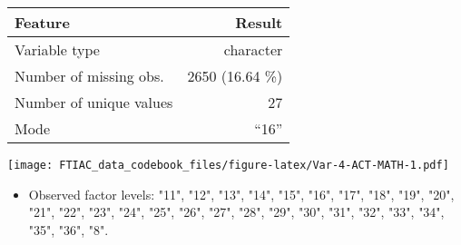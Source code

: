 \documentclass[]{article}
\providecommand{\tightlist}{%
  \setlength{\itemsep}{0pt}\setlength{\parskip}{0pt}}
\newcommand{\fullline}{\noindent\makebox[\linewidth]{\rule{\textwidth}{0.4pt}}}
\newcommand{\bminione}{\begin{minipage}{0.75 \textwidth}}
\newcommand{\bminitwo}{\begin{minipage}{0.25 \textwidth}}
\newcommand{\emini}{\end{minipage}}
\begin{document}
\bminione

\begin{longtable}[]{@{}lr@{}}
\toprule
\begin{minipage}[b]{0.34\columnwidth}\raggedright\strut
Feature\strut
\end{minipage} & \begin{minipage}[b]{0.21\columnwidth}\raggedleft\strut
Result\strut
\end{minipage}\tabularnewline
\midrule
\endhead
\begin{minipage}[t]{0.34\columnwidth}\raggedright\strut
Variable type\strut
\end{minipage} & \begin{minipage}[t]{0.21\columnwidth}\raggedleft\strut
character\strut
\end{minipage}\tabularnewline
\begin{minipage}[t]{0.34\columnwidth}\raggedright\strut
Number of missing obs.\strut
\end{minipage} & \begin{minipage}[t]{0.21\columnwidth}\raggedleft\strut
2650 (16.64 \%)\strut
\end{minipage}\tabularnewline
\begin{minipage}[t]{0.34\columnwidth}\raggedright\strut
Number of unique values\strut
\end{minipage} & \begin{minipage}[t]{0.21\columnwidth}\raggedleft\strut
27\strut
\end{minipage}\tabularnewline
\begin{minipage}[t]{0.34\columnwidth}\raggedright\strut
Mode\strut
\end{minipage} & \begin{minipage}[t]{0.21\columnwidth}\raggedleft\strut
``16''\strut
\end{minipage}\tabularnewline
\bottomrule
\end{longtable}

\emini
\bminitwo
\texttt{[image: FTIAC\_data\_codebook\_files/figure-latex/Var-4-ACT-MATH-1.pdf]}
\emini

\begin{itemize}
\tightlist
\item
  Observed factor levels: "11", "12", "13", "14", "15", "16", "17",
  "18", "19", "20", "21", "22", "23", "24", "25", "26", "27", "28",
  "29", "30", "31", "32", "33", "34", "35", "36", "8".
\end{itemize}

\fullline
\end{document}
